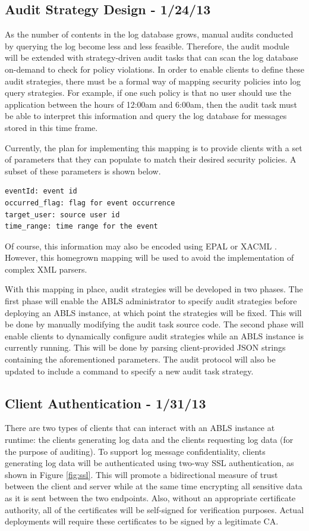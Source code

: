 \documentclass{sig-alternate}
\begin{document}
\subsection{Audit Strategy Design - 1/24/13}
As the number of contents in the log database grows, manual audits conducted by querying the log become less and less 
feasible. Therefore, the audit module will be extended with strategy-driven audit tasks that can scan the log database 
on-demand to check for policy violations. In order to enable clients to define these audit strategies, there must be a 
formal way of mapping security policies into log query strategies. For example, if one such policy is that no user should use 
the application between the hours of 12:00am and 6:00am, then the audit task must be able to interpret this information
and query the log database for messages stored in this time frame. 

Currently, the plan for implementing this mapping is to provide clients with a set of parameters that they can populate to
match their desired security policies. A subset of these parameters is shown below.
\begin{lstlisting}
eventId: event id
occurred_flag: flag for event occurrence
target_user: source user id
time_range: time range for the event
\end{lstlisting}

Of course, this information may also be encoded using EPAL or XACML \cite{Anderson2005-ComparisonEAPL_XACML}.
However, this homegrown mapping will be used to avoid the implementation of complex XML parsers. 

With this mapping in place, audit strategies will be developed in two phases. The first phase will enable the 
ABLS administrator to specify audit strategies before deploying an ABLS instance, at which point the strategies 
will be fixed. This will be done by manually modifying the audit task source code. The second phase will enable 
clients to dynamically configure audit strategies while an ABLS instance is currently running. This will be done 
by parsing client-provided JSON strings containing the aforementioned parameters. The audit protocol will also 
be updated to include a command to specify a new audit task strategy.

\subsection{Client Authentication - 1/31/13}
\label{sec:auth}
There are two types of clients that can interact with an ABLS instance at runtime: the clients generating log data and the
clients requesting log data (for the purpose of auditing). To support log message confidentiality, clients generating 
log data will be authenticated using two-way SSL authentication, as shown in Figure \ref{fig:ssl}. This will 
promote a bidirectional measure of trust between the client and server while at the same time encrypting 
all sensitive data as it is sent between the two endpoints. Also, without an appropriate certificate authority, all
of the certificates will be self-signed for verification purposes. Actual deployments will require these certificates
to be signed by a legitimate CA.
\end{document}
